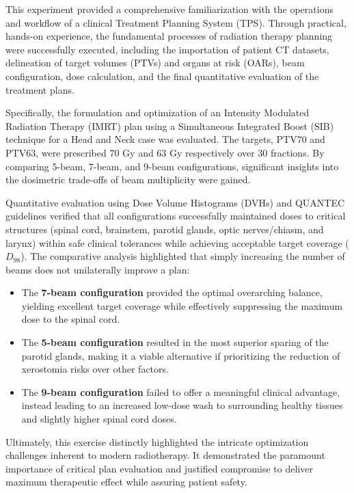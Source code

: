 
This experiment provided a comprehensive familiarization with the operations and workflow of a clinical Treatment Planning System (TPS). Through practical, hands-on experience, the fundamental processes of radiation therapy planning were successfully executed, including the importation of patient CT datasets, delineation of target volumes (PTVs) and organs at risk (OARs), beam configuration, dose calculation, and the final quantitative evaluation of the treatment plans.

Specifically, the formulation and optimization of an Intensity Modulated Radiation Therapy (IMRT) plan using a Simultaneous Integrated Boost (SIB) technique for a Head and Neck case was evaluated. The targets, PTV70 and PTV63, were prescribed 70 Gy and 63 Gy respectively over 30 fractions. By comparing 5-beam, 7-beam, and 9-beam configurations, significant insights into the dosimetric trade-offs of beam multiplicity were gained. 

Quantitative evaluation using Dose Volume Histograms (DVHs) and QUANTEC guidelines verified that all configurations successfully maintained doses to critical structures (spinal cord, brainstem, parotid glands, optic nerves/chiasm, and larynx) within safe clinical tolerances while achieving acceptable target coverage ($D_{98}$). The comparative analysis highlighted that simply increasing the number of beams does not unilaterally improve a plan:
\begin{itemize}
    \item The \textbf{7-beam configuration} provided the optimal overarching balance, yielding excellent target coverage while effectively suppressing the maximum dose to the spinal cord.
    \item The \textbf{5-beam configuration} resulted in the most superior sparing of the parotid glands, making it a viable alternative if prioritizing the reduction of xerostomia risks over other factors.
    \item The \textbf{9-beam configuration} failed to offer a meaningful clinical advantage, instead leading to an increased low-dose wash to surrounding healthy tissues and slightly higher spinal cord doses.
\end{itemize}

Ultimately, this exercise distinctly highlighted the intricate optimization challenges inherent to modern radiotherapy. It demonstrated the paramount importance of critical plan evaluation and justified compromise to deliver maximum therapeutic effect while assuring patient safety.